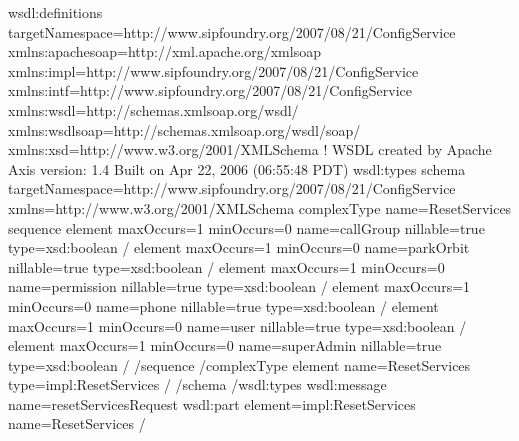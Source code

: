 \documentclass[letterpaper,10pt,english]{sphinxmanual}
\begin{document}
\begin{sphinxVerbatim}[commandchars=\\\{\}]
\PYGZlt{}wsdl:definitions targetNamespace=\PYGZdq{}http://www.sipfoundry.org/2007/08/21/ConfigService\PYGZdq{} xmlns:apachesoap=\PYGZdq{}http://xml.apache.org/xml\PYGZhy{}soap\PYGZdq{} xmlns:impl=\PYGZdq{}http://www.sipfoundry.org/2007/08/21/ConfigService\PYGZdq{} xmlns:intf=\PYGZdq{}http://www.sipfoundry.org/2007/08/21/ConfigService\PYGZdq{} xmlns:wsdl=\PYGZdq{}http://schemas.xmlsoap.org/wsdl/\PYGZdq{} xmlns:wsdlsoap=\PYGZdq{}http://schemas.xmlsoap.org/wsdl/soap/\PYGZdq{} xmlns:xsd=\PYGZdq{}http://www.w3.org/2001/XMLSchema\PYGZdq{}\PYGZgt{}
\PYGZhy{} \PYGZlt{}!\PYGZhy{}\PYGZhy{}
WSDL created by Apache Axis version: 1.4
Built on Apr 22, 2006 (06:55:48 PDT)
\PYGZhy{}\PYGZhy{}\PYGZgt{}
\PYGZlt{}wsdl:types\PYGZgt{}
\PYGZlt{}schema targetNamespace=\PYGZdq{}http://www.sipfoundry.org/2007/08/21/ConfigService\PYGZdq{} xmlns=\PYGZdq{}http://www.w3.org/2001/XMLSchema\PYGZdq{}\PYGZgt{}
\PYGZlt{}complexType name=\PYGZdq{}ResetServices\PYGZdq{}\PYGZgt{}
\PYGZlt{}sequence\PYGZgt{}
\PYGZlt{}element maxOccurs=\PYGZdq{}1\PYGZdq{} minOccurs=\PYGZdq{}0\PYGZdq{} name=\PYGZdq{}callGroup\PYGZdq{} nillable=\PYGZdq{}true\PYGZdq{} type=\PYGZdq{}xsd:boolean\PYGZdq{} /\PYGZgt{}
\PYGZlt{}element maxOccurs=\PYGZdq{}1\PYGZdq{} minOccurs=\PYGZdq{}0\PYGZdq{} name=\PYGZdq{}parkOrbit\PYGZdq{} nillable=\PYGZdq{}true\PYGZdq{} type=\PYGZdq{}xsd:boolean\PYGZdq{} /\PYGZgt{}
\PYGZlt{}element maxOccurs=\PYGZdq{}1\PYGZdq{} minOccurs=\PYGZdq{}0\PYGZdq{} name=\PYGZdq{}permission\PYGZdq{} nillable=\PYGZdq{}true\PYGZdq{} type=\PYGZdq{}xsd:boolean\PYGZdq{} /\PYGZgt{}
\PYGZlt{}element maxOccurs=\PYGZdq{}1\PYGZdq{} minOccurs=\PYGZdq{}0\PYGZdq{} name=\PYGZdq{}phone\PYGZdq{} nillable=\PYGZdq{}true\PYGZdq{} type=\PYGZdq{}xsd:boolean\PYGZdq{} /\PYGZgt{}
\PYGZlt{}element maxOccurs=\PYGZdq{}1\PYGZdq{} minOccurs=\PYGZdq{}0\PYGZdq{} name=\PYGZdq{}user\PYGZdq{} nillable=\PYGZdq{}true\PYGZdq{} type=\PYGZdq{}xsd:boolean\PYGZdq{} /\PYGZgt{}
\PYGZlt{}element maxOccurs=\PYGZdq{}1\PYGZdq{} minOccurs=\PYGZdq{}0\PYGZdq{} name=\PYGZdq{}superAdmin\PYGZdq{} nillable=\PYGZdq{}true\PYGZdq{} type=\PYGZdq{}xsd:boolean\PYGZdq{} /\PYGZgt{}
\PYGZlt{}/sequence\PYGZgt{}
\PYGZlt{}/complexType\PYGZgt{}
\PYGZlt{}element name=\PYGZdq{}ResetServices\PYGZdq{} type=\PYGZdq{}impl:ResetServices\PYGZdq{} /\PYGZgt{}
\PYGZlt{}/schema\PYGZgt{}
\PYGZlt{}/wsdl:types\PYGZgt{}
\PYGZlt{}wsdl:message name=\PYGZdq{}resetServicesRequest\PYGZdq{}\PYGZgt{}
\PYGZlt{}wsdl:part element=\PYGZdq{}impl:ResetServices\PYGZdq{} name=\PYGZdq{}ResetServices\PYGZdq{} /\PYGZgt{}

\end{sphinxVerbatim}
\end{document}
